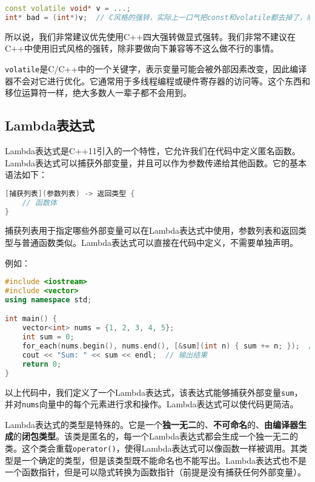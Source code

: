 \begin{lstlisting}[language=C++]
const volatile void* v = ...;
int* bad = (int*)v;  // C风格的强转，实际上一口气把const和volatile都去掉了，顺便做了个按位重解释
\end{lstlisting}

所以说，我们非常建议优先使用C++四大强转做显式强转。我们非常不建议在C++中使用旧式风格的强转，除非要做向下兼容等不这么做不行的事情。

\begin{note}
  \texttt{volatile}是C/C++中的一个关键字，表示变量可能会被外部因素改变，因此编译器不会对它进行优化。它通常用于多线程编程或硬件寄存器的访问等。这个东西和移位运算符一样，绝大多数人一辈子都不会用到。
\end{note}

\subsection{Lambda表达式}

Lambda表达式是C++11引入的一个特性，它允许我们在代码中定义匿名函数。Lambda表达式可以捕获外部变量，并且可以作为参数传递给其他函数。它的基本语法如下：
\begin{lstlisting}[language=C++]
[捕获列表](参数列表) -> 返回类型 {
    // 函数体
}
\end{lstlisting}
捕获列表用于指定哪些外部变量可以在Lambda表达式中使用，参数列表和返回类型与普通函数类似。Lambda表达式可以直接在代码中定义，不需要单独声明。

例如：
\begin{lstlisting}[language=C++]
#include <iostream>
#include <vector>
using namespace std;

int main() {
    vector<int> nums = {1, 2, 3, 4, 5};
    int sum = 0;
    for_each(nums.begin(), nums.end(), [&sum](int n) { sum += n; });  // 使用Lambda表达式计算总和
    cout << "Sum: " << sum << endl;  // 输出结果
    return 0;
}
\end{lstlisting}
以上代码中，我们定义了一个Lambda表达式，该表达式能够捕获外部变量\texttt{sum}，并对\texttt{nums}向量中的每个元素进行求和操作。Lambda表达式可以使代码更简洁。

Lambda表达式的类型是特殊的。它是一个\textbf{独一无二}的、\textbf{不可命名}的、\textbf{由编译器生成}的\textbf{闭包类型}。该类是匿名的，每一个Lambda表达式都会生成一个独一无二的类。这个类会重载\texttt{operator()}，使得Lambda表达式可以像函数一样被调用。其类型是一个确定的类型，但是该类型既不能命名也不能写出。Lambda表达式也不是一个函数指针，但是可以隐式转换为函数指针（前提是没有捕获任何外部变量）。

